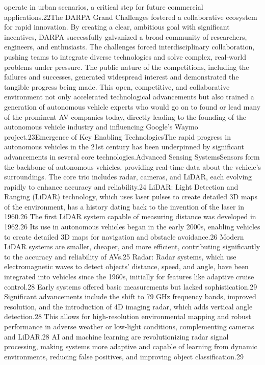 operate in urban scenarios, a critical step for future commercial applications.22The DARPA Grand Challenges fostered a collaborative ecosystem for rapid innovation. By creating a clear, ambitious goal with significant incentives, DARPA successfully galvanized a broad community of researchers, engineers, and enthusiasts. The challenges forced interdisciplinary collaboration, pushing teams to integrate diverse technologies and solve complex, real-world problems under pressure. The public nature of the competitions, including the failures and successes, generated widespread interest and demonstrated the tangible progress being made. This open, competitive, and collaborative environment not only accelerated technological advancements but also trained a generation of autonomous vehicle experts who would go on to found or lead many of the prominent AV companies today, directly leading to the founding of the autonomous vehicle industry and influencing Google's Waymo project.23Emergence of Key Enabling TechnologiesThe rapid progress in autonomous vehicles in the 21st century has been underpinned by significant advancements in several core technologies.Advanced Sensing SystemsSensors form the backbone of autonomous vehicles, providing real-time data about the vehicle's surroundings. The core trio includes radar, cameras, and LiDAR, each evolving rapidly to enhance accuracy and reliability.24
LiDAR: Light Detection and Ranging (LiDAR) technology, which uses laser pulses to create detailed 3D maps of the environment, has a history dating back to the invention of the laser in 1960.26 The first LiDAR system capable of measuring distance was developed in 1962.26 Its use in autonomous vehicles began in the early 2000s, enabling vehicles to create detailed 3D maps for navigation and obstacle avoidance.26 Modern LiDAR systems are smaller, cheaper, and more efficient, contributing significantly to the accuracy and reliability of AVs.25
Radar: Radar systems, which use electromagnetic waves to detect objects' distance, speed, and angle, have been integrated into vehicles since the 1960s, initially for features like adaptive cruise control.28 Early systems offered basic measurements but lacked sophistication.29 Significant advancements include the shift to 79 GHz frequency bands, improved resolution, and the introduction of 4D imaging radar, which adds vertical angle detection.28 This allows for high-resolution environmental mapping and robust performance in adverse weather or low-light conditions, complementing cameras and LiDAR.28 AI and machine learning are revolutionizing radar signal processing, making systems more adaptive and capable of learning from dynamic environments, reducing false positives, and improving object classification.29
